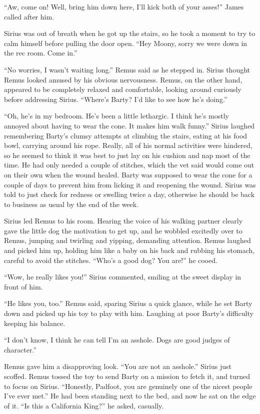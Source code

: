 \documentclass[12pt,twoside,openright]{memoir}
\begin{document}
``Aw, come on! Well, bring him down here, I'll kick both of your asses!'' James called after him.

Sirius was out of breath when he got up the stairs, so he took a moment to try to calm himself before pulling the door open. ``Hey Moony, sorry we were down in the rec room. Come in.''

``No worries, I wasn't waiting long.'' Remus said as he stepped in. Sirius thought Remus looked amused by his obvious nervousness. Remus, on the other hand, appeared to be completely relaxed and comfortable, looking around curiously before addressing Sirius. ``Where's Barty? I'd like to see how he's doing.''

``Oh, he's in my bedroom. He's been a little lethargic. I think he's mostly annoyed about having to wear the cone. It makes him walk funny.'' Sirius laughed remembering Barty's clumsy attempts at climbing the stairs, eating at his food bowl, carrying around his rope. Really, all of his normal activities were hindered, so he seemed to think it was best to just lay on his cushion and nap most of the time. He had only needed a couple of stitches, which the vet said would come out on their own when the wound healed. Barty was supposed to wear the cone for a couple of days to prevent him from licking it and reopening the wound. Sirius was told to just check for redness or swelling twice a day, otherwise he should be back to business as usual by the end of the week.

Sirius led Remus to his room. Hearing the voice of his walking partner clearly gave the little dog the motivation to get up, and he wobbled excitedly over to Remus, jumping and twirling and yipping, demanding attention. Remus laughed and picked him up, holding him like a baby on his back and rubbing his stomach, careful to avoid the stitches. ``Who's a good dog? You are!'' he cooed.

``Wow, he really likes you!'' Sirius commented, smiling at the sweet display in front of him.

``He likes you, too.'' Remus said, sparing Sirius a quick glance, while he set Barty down and picked up his toy to play with him. Laughing at poor Barty's difficulty keeping his balance.

``I don't know, I think he can tell I'm an asshole. Dogs are good judges of character.''

Remus gave him a disapproving look. ``You are not an asshole.'' Sirius just scoffed. Remus tossed the toy to send Barty on a mission to fetch it, and turned to focus on Sirius. ``Honestly, Padfoot, you are genuinely one of the nicest people I've ever met.'' He had been standing next to the bed, and now he sat on the edge of it. ``Is this a California King?'' he asked, casually.
\end{document}
